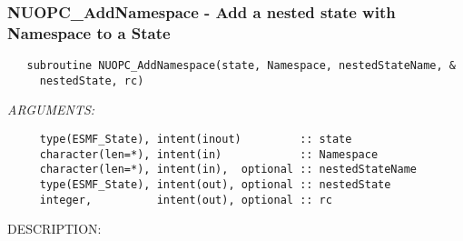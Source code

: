  
\setlength{\oldparskip}{\parskip}
\setlength{\parskip}{1.5ex}
\setlength{\oldparindent}{\parindent}
\setlength{\parindent}{0pt}
\setlength{\oldbaselineskip}{\baselineskip}
\setlength{\baselineskip}{11pt}
 
\def\bv{\begin{verbatim}}
\def\ev{\end{verbatim}}
\def\be{\begin{equation}}
\def\ee{\end{equation}}
\def\bea{\begin{eqnarray}}
\def\eea{\end{eqnarray}}
\def\bi{\begin{itemize}}
\def\ei{\end{itemize}}
\def\bn{\begin{enumerate}}
\def\en{\end{enumerate}}
\def\bd{\begin{description}}
\def\ed{\end{description}}
\def\({\left (}
\def\){\right )}
\def\[{\left [}
\def\]{\right ]}
\def\<{\left  \langle}
\def\>{\right \rangle}
\def\cI{{\cal I}}
\def\diag{\mathop{\rm diag}}
\def\tr{\mathop{\rm tr}}


 
\subsubsection [NUOPC\_AddNamespace] {NUOPC\_AddNamespace - Add a nested state with Namespace to a State}


\begin{verbatim}   subroutine NUOPC_AddNamespace(state, Namespace, nestedStateName, &
     nestedState, rc)\end{verbatim}{\em ARGUMENTS:}
\begin{verbatim}     type(ESMF_State), intent(inout)         :: state
     character(len=*), intent(in)            :: Namespace
     character(len=*), intent(in),  optional :: nestedStateName
     type(ESMF_State), intent(out), optional :: nestedState
     integer,          intent(out), optional :: rc\end{verbatim}
{\sf DESCRIPTION:\\ }



